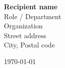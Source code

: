 \begin{minipage}[t]{0.62\linewidth}
\textbf{Recipient name}\\
Role / Department\\
Organization\\
Street address\\
City, Postal code
\end{minipage}\hfill
\begin{minipage}[t]{0.32\linewidth}\raggedleft
{\small\color{muted}\today}
\end{minipage}
\vspace{22pt}

